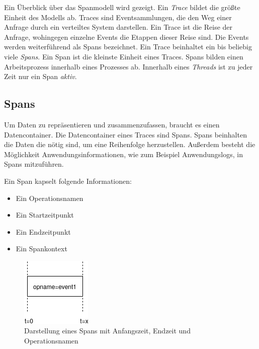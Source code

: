 Ein Überblick über das Spanmodell wird gezeigt. Ein \emph{Trace} bildet die größte Einheit des Modells ab. Traces sind Eventsammlungen, die den Weg einer Anfrage durch ein verteiltes System darstellen. Ein Trace ist die Reise der Anfrage, wohingegen einzelne Events die Etappen dieser Reise sind. Die Events werden weiterführend als Spans bezeichnet.  Ein Trace beinhaltet ein bis beliebig viele \emph{Spans}. Ein Span ist die kleinste Einheit eines Traces. Spans bilden einen Arbeitsprozess innerhalb eines Prozesses ab. Innerhalb eines \emph{Threads} ist zu jeder Zeit nur ein Span \emph{aktiv}.


\subsection{Spans}
\label{subsection:Spans}
Um Daten zu repräsentieren und zusammenzufassen, braucht es einen Datencontainer. Die Datencontainer eines Traces sind Spans. Spans beinhalten die Daten die nötig sind, um eine Reihenfolge herzustellen. Außerdem besteht die Möglichkeit Anwendungsinformationen, wie zum Beispiel Anwendungslogs, in Spans mitzuführen.

Ein Span kapselt folgende Informationen:
\begin{itemize}
	\item Ein Operationsnamen
	\item Ein Startzeitpunkt
	\item Ein Endzeitpunkt
	\item Ein Spankontext
\end{itemize}

\begin{figure}
	\centering
	\includegraphics[scale=0.7]{img/Design/Span.png}
	\caption[Zeitliche Darstellung eines Spans]{Darstellung eines Spans mit Anfangszeit, Endzeit und Operationsnamen}
	\label{fig:Span}
\end{figure}

